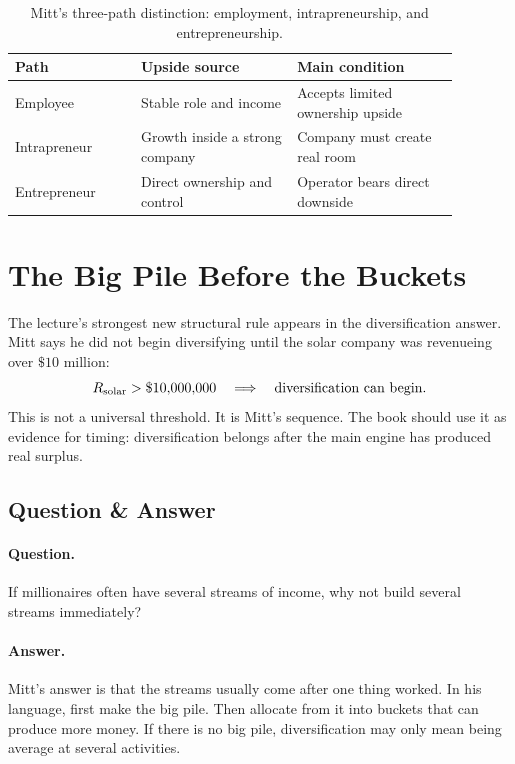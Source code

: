 \documentclass[11pt,oneside]{book}
\begin{document}
\begin{table}
\centering
\small
\begin{tabular}{p{0.25\linewidth}p{0.31\linewidth}p{0.32\linewidth}}
\hline
Path & Upside source & Main condition \\
\hline
Employee & Stable role and income & Accepts limited ownership upside \\
Intrapreneur & Growth inside a strong company & Company must create real room \\
Entrepreneur & Direct ownership and control & Operator bears direct downside \\
\hline
\end{tabular}
\caption{Mitt's three-path distinction: employment, intrapreneurship, and entrepreneurship.}
\end{table}

\section{The Big Pile Before the Buckets}

The lecture's strongest new structural rule appears in the diversification answer. Mitt says he did not begin diversifying until the solar company was revenueing over \(\$10\) million:
\[
R_{\mathrm{solar}}>\$10{,}000{,}000
\quad\Longrightarrow\quad
\hbox{diversification can begin}.
\]
This is not a universal threshold. It is Mitt's sequence. The book should use it as evidence for timing: diversification belongs after the main engine has produced real surplus.

\subsection{Question \& Answer}

\paragraph{Question.}
If millionaires often have several streams of income, why not build several streams immediately?

\paragraph{Answer.}
Mitt's answer is that the streams usually come after one thing worked. In his language, first make the big pile. Then allocate from it into buckets that can produce more money. If there is no big pile, diversification may only mean being average at several activities.
\end{document}
